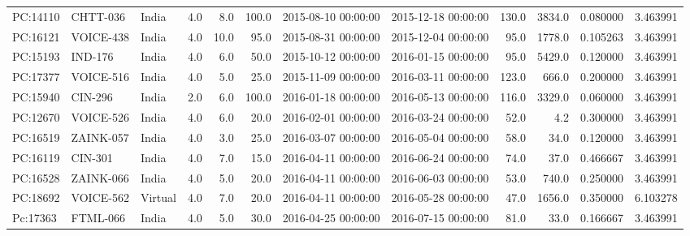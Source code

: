 \begin{tabular}{lllrrrllrrrr}
 PC:14110 &     CHTT-036 &    India &       4.0 &              8.0 &             100.0 &  2015-08-10 00:00:00 &  2015-12-18 00:00:00 &     130.0 &         3834.0 &     0.080000 &            3.463991 \\
 PC:16121 &    VOICE-438 &    India &       4.0 &             10.0 &              95.0 &  2015-08-31 00:00:00 &  2015-12-04 00:00:00 &      95.0 &         1778.0 &     0.105263 &            3.463991 \\
 PC:15193 &      IND-176 &    India &       4.0 &              6.0 &              50.0 &  2015-10-12 00:00:00 &  2016-01-15 00:00:00 &      95.0 &         5429.0 &     0.120000 &            3.463991 \\
 PC:17377 &    VOICE-516 &    India &       4.0 &              5.0 &              25.0 &  2015-11-09 00:00:00 &  2016-03-11 00:00:00 &     123.0 &          666.0 &     0.200000 &            3.463991 \\
 PC:15940 &      CIN-296 &    India &       2.0 &              6.0 &             100.0 &  2016-01-18 00:00:00 &  2016-05-13 00:00:00 &     116.0 &         3329.0 &     0.060000 &            3.463991 \\
 PC:12670 &    VOICE-526 &    India &       4.0 &              6.0 &              20.0 &  2016-02-01 00:00:00 &  2016-03-24 00:00:00 &      52.0 &            4.2 &     0.300000 &            3.463991 \\
 PC:16519 &    ZAINK-057 &    India &       4.0 &              3.0 &              25.0 &  2016-03-07 00:00:00 &  2016-05-04 00:00:00 &      58.0 &           34.0 &     0.120000 &            3.463991 \\
 PC:16119 &      CIN-301 &    India &       4.0 &              7.0 &              15.0 &  2016-04-11 00:00:00 &  2016-06-24 00:00:00 &      74.0 &           37.0 &     0.466667 &            3.463991 \\
 PC:16528 &    ZAINK-066 &    India &       4.0 &              5.0 &              20.0 &  2016-04-11 00:00:00 &  2016-06-03 00:00:00 &      53.0 &          740.0 &     0.250000 &            3.463991 \\
 PC:18692 &    VOICE-562 &  Virtual &       4.0 &              7.0 &              20.0 &  2016-04-11 00:00:00 &  2016-05-28 00:00:00 &      47.0 &         1656.0 &     0.350000 &            6.103278 \\
 Pc:17363 &     FTML-066 &    India &       4.0 &              5.0 &              30.0 &  2016-04-25 00:00:00 &  2016-07-15 00:00:00 &      81.0 &           33.0 &     0.166667 &            3.463991 \\

\end{tabular}
